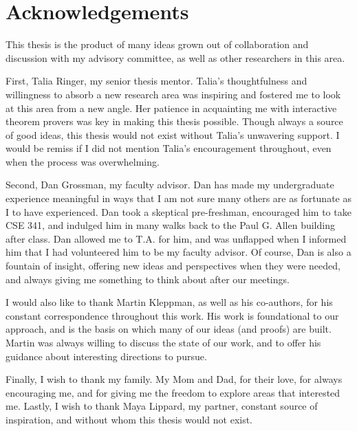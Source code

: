 \chapter*{Acknowledgements}

This thesis is the product of many ideas grown out of collaboration and
discussion with my advisory committee, as well as other researchers in this
area.

First, Talia Ringer, my senior thesis mentor. Talia's thoughtfulness and
willingness to absorb a new research area was inspiring and fostered me to
look at this area from a new angle. Her patience in acquainting me with
interactive theorem provers was key in making this thesis possible. Though
always a source of good ideas, this thesis would not exist without Talia's
unwavering support. I would be remiss if I did not mention Talia's encouragement
throughout, even when the process was overwhelming.

Second, Dan Grossman, my faculty advisor. Dan has made my undergraduate
experience meaningful in ways that I am not sure many others are as fortunate as
I to have experienced. Dan took a skeptical pre-freshman, encouraged him to take
CSE 341, and indulged him in many walks back to the Paul G. Allen building after
class. Dan allowed me to T.A. for him, and was unflapped when I informed him
that I had volunteered him to be my faculty advisor. Of course, Dan is also a
fountain of insight, offering new ideas and perspectives when they were needed,
and always giving me something to think about after our meetings.

I would also like to thank Martin Kleppman, as well as his co-authors, for his
constant correspondence throughout this work. His work is foundational to our
approach, and is the basis on which many of our ideas (and proofs) are built.
Martin was always willing to discuss the state of our work, and to offer his
guidance about interesting directions to pursue.

Finally, I wish to thank my family. My Mom and Dad, for their love, for always
encouraging me, and for giving me the freedom to explore areas that interested
me. Lastly, I wish to thank Maya Lippard, my partner, constant source of
inspiration, and without whom this thesis would not exist.
